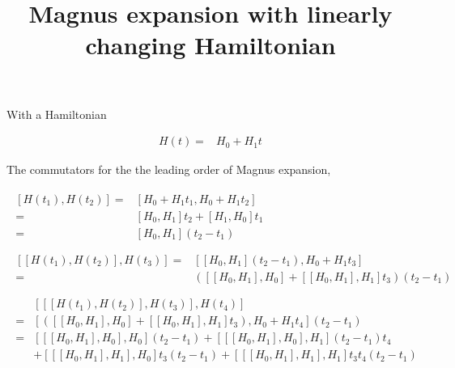 \documentclass[10pt,fleqn]{article}
\title{Magnus expansion with linearly changing Hamiltonian}
\newcommand{\eqar}[1]
{
  \begin{align}
    #1
  \end{align}
}
\newcommand{\paren}[1]{{\left({#1}\right)}}
\newcommand{\sqr}[1]{{\left[{#1}\right]}}
\begin{document}
\maketitle

With a Hamiltonian

\eqar{
  H(t)=&H_0+H_1 t
}

The commutators for the the leading order of Magnus expansion,

\eqar{
  \begin{split}
    \sqr{H(t_1),H(t_2)}=&\sqr{H_0+H_1 t_1,H_0+H_1 t_2}\\
    =&\sqr{H_0,H_1} t_2+\sqr{H_1,H_0} t_1\\
    =&\sqr{H_0,H_1} \paren{t_2-t_1}\\
  \end{split}\\
  \begin{split}
    \sqr{\sqr{H(t_1),H(t_2)},H(t_3)}=&\sqr{\sqr{H_0,H_1} \paren{t_2-t_1},H_0+H_1 t_3}\\
    =&\paren{\sqr{\sqr{H_0,H_1},H_0}+\sqr{\sqr{H_0,H_1},H_1} t_3}\paren{t_2-t_1}\\
  \end{split}\\
  \begin{split}
    &\sqr{\sqr{\sqr{H(t_1),H(t_2)},H(t_3)},H(t_4)}\\
    =&\sqr{\paren{\sqr{\sqr{H_0,H_1},H_0}+\sqr{\sqr{H_0,H_1},H_1} t_3},H_0+H_1 t_4}\paren{t_2-t_1}\\
    =&\sqr{\sqr{\sqr{H_0,H_1},H_0},H_0}\paren{t_2-t_1}+\sqr{\sqr{\sqr{H_0,H_1},H_0},H_1}\paren{t_2-t_1} t_4\\
     &+\sqr{\sqr{\sqr{H_0,H_1},H_1},H_0}t_3 \paren{t_2-t_1}+\sqr{\sqr{\sqr{H_0,H_1},H_1},H_1}t_3 t_4\paren{t_2-t_1}\\
  \end{split}
}
\end{document}
